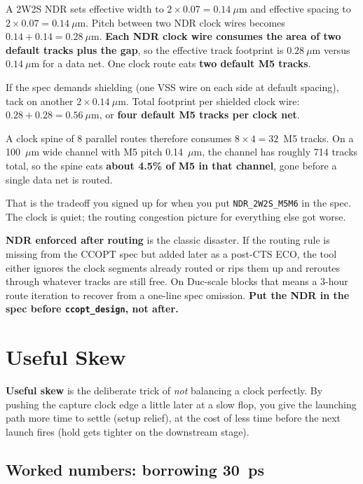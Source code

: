  A 2W2S NDR sets effective width to $2 \times 0.07 = 0.14~\mu$m and effective spacing to $2 \times 0.07 = 0.14~\mu$m. Pitch between two NDR clock wires becomes $0.14 + 0.14 = 0.28~\mu$m. \textbf{Each NDR clock wire consumes the area of two default tracks plus the gap}, so the effective track footprint is $0.28~\mu$m versus $0.14~\mu$m for a data net. One clock route eats \textbf{two default M5 tracks}.

 If the spec demands shielding (one VSS wire on each side at default spacing), tack on another $2 \times 0.14~\mu$m. Total footprint per shielded clock wire: $0.28 + 0.28 = 0.56~\mu$m, or \textbf{four default M5 tracks per clock net}.

 A clock spine of 8 parallel routes therefore consumes $8 \times 4 = 32$~M5 tracks. On a 100~$\mu$m wide channel with M5 pitch 0.14~$\mu$m, the channel has roughly 714 tracks total, so the spine eats \textbf{about 4.5\% of M5 in that channel}, gone before a single data net is routed.

That is the tradeoff you signed up for when you put \texttt{NDR\_2W2S\_M5M6} in the spec. The clock is quiet; the routing congestion picture for everything else got worse.

\begin{pitfall}
\textbf{NDR enforced after routing} is the classic disaster. If the routing rule is missing from the CCOPT spec but added later as a post-CTS ECO, the tool either ignores the clock segments already routed or rips them up and reroutes through whatever tracks are still free. On Duc-scale blocks that means a 3-hour route iteration to recover from a one-line spec omission. \textbf{Put the NDR in the spec before \texttt{ccopt\_design}, not after.}
\end{pitfall}

\section{Useful Skew}

\textbf{Useful skew} is the deliberate trick of \emph{not} balancing a clock perfectly. By pushing the capture clock edge a little later at a slow flop, you give the launching path more time to settle (setup relief), at the cost of less time before the next launch fires (hold gets tighter on the downstream stage).

\subsection*{Worked numbers: borrowing 30~ps}


